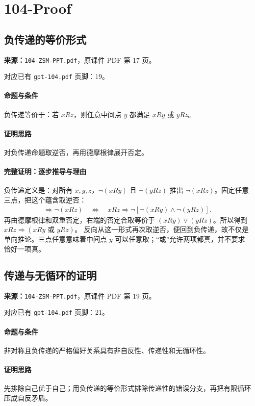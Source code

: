 \clearpage\section{104-Proof}
\clearpage\subsection{负传递的等价形式}
\textbf{来源：}\texttt{104-ZSM-PPT.pdf}，原课件 PDF 第 17 页。\par
对应已有 \texttt{gpt-104.pdf} 页脚：19。\par
\paragraph{命题与条件}负传递等价于：若 $xRz$，则任意中间点 $y$ 都满足 $xRy$ 或 $yRz$。
\paragraph{证明思路}对负传递命题取逆否，再用德摩根律展开否定。
\paragraph{完整证明：逐步推导与理由}

负传递定义是：对所有 $x,y,z$，$\neg(xRy)$ 且 $\neg(yRz)$ 推出 $\neg(xRz)$。固定任意三点，把这个蕴含取逆否：
\begin{align*}
[\neg(xRy)\land\neg(yRz)]\Rightarrow\neg(xRz)
\quad\Longleftrightarrow\quad
xRz\Rightarrow\neg[\neg(xRy)\land\neg(yRz)].
\end{align*}
再由德摩根律和双重否定，右端的否定合取等价于 $(xRy)\lor(yRz)$。所以得到 $xRz\Rightarrow(xRy\text{ 或 }yRz)$。
反向从这一形式再次取逆否，便回到负传递，故不仅是单向推论。三点任意意味着中间点 $y$ 可以任意取；“或”允许两项都真，并不要求恰好一项真。

\clearpage\subsection{传递与无循环的证明}
\textbf{来源：}\texttt{104-ZSM-PPT.pdf}，原课件 PDF 第 19 页。\par
对应已有 \texttt{gpt-104.pdf} 页脚：21。\par
\paragraph{命题与条件}非对称且负传递的严格偏好关系具有非自反性、传递性和无循环性。
\paragraph{证明思路}先排除自己优于自己；用负传递的等价形式排除传递性的错误分支，再把有限循环压成自反矛盾。
